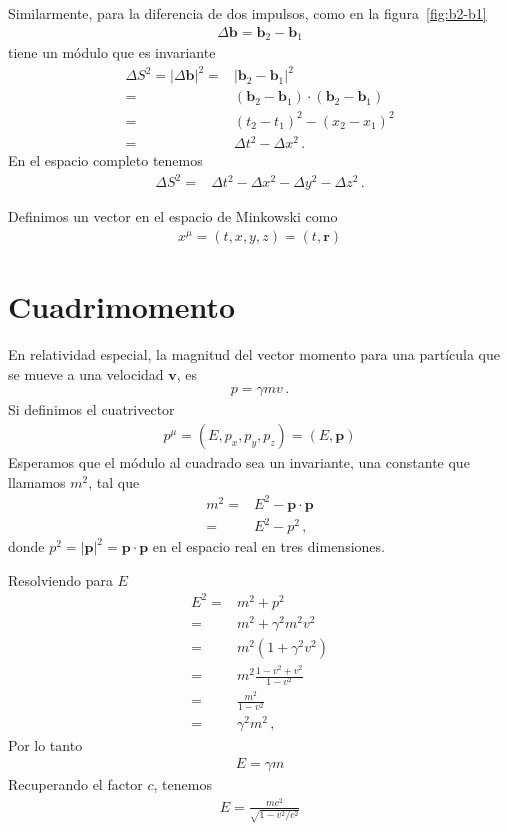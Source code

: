 \documentclass[11pt,a4paper]{article}
\begin{document}
Similarmente, para la diferencia de dos impulsos, como en la figura~\ref{fig:b2-b1}
\begin{align*}
    \Delta\boldsymbol{b} = \boldsymbol{b}_2 - \boldsymbol{b}_1 
\end{align*}
tiene un módulo que es invariante
\begin{align*}
    \Delta S^2 = |\Delta\boldsymbol{b}|^2=& |\boldsymbol{b}_2 -\boldsymbol{b}_1 |^2\\
    =&(\boldsymbol{b}_2 -\boldsymbol{b}_1)\cdot (\boldsymbol{b}_2 -\boldsymbol{b}_1)  \\
=&\left(t_2-t_1\right)^2 -\left(x_2-x_1\right)^2\\
    = &\Delta t^2 - \Delta x^2\,. 
\end{align*}
En el espacio completo tenemos
\begin{align*}
    \Delta S^2 =
     &\Delta t^2 - \Delta x^2 - \Delta y^2 - \Delta z^2\,. 
\end{align*}

Definimos un vector en el espacio de Minkowski como
\begin{align*}
    x^\mu = (t,x,y,z) = (t,\boldsymbol{r})
\end{align*}

\section{Cuadrimomento}
En relatividad especial, la magnitud del vector momento para una partícula que se mueve a una velocidad $\boldsymbol{v}$, es
\begin{align*}
    p= \gamma m v\,.
\end{align*}
Si definimos el cuatrivector
\begin{align*}
    p^\mu = (E,p_x,p_y,p_z) = (E,\boldsymbol{p})
\end{align*}
Esperamos que el módulo al cuadrado sea un invariante, una constante que llamamos $m^2$, tal que
\begin{align*}
    m^2 =& E^2 - \boldsymbol{p}\cdot\boldsymbol{p} \\
        =&   E^2 -p^2\,,
\end{align*}
donde $p^2 = |\boldsymbol{p}|^2 =\boldsymbol{p}\cdot\boldsymbol{p} $ en el espacio real en tres dimensiones.

Resolviendo para $E$
\begin{align*}
    E^2 =& m^2 + p^2\\
         =& m^2 + \gamma^2 m^2 v^2\\
         =& m^2(1+\gamma^2 v^2)\\
         =& m^2 \frac{1-v^2 + v^2}{1-v^2}\\
         =& \frac{m^2}{1-v^2}\\
         =& \gamma^2 m^2\,,
\end{align*}
Por lo tanto
\begin{align}
    E = \gamma m
\end{align}
Recuperando el factor $c$, tenemos
\begin{align}
    E = \frac{m c^2}{\sqrt{1-v^2/c^2}}
\end{align}
\end{document}
